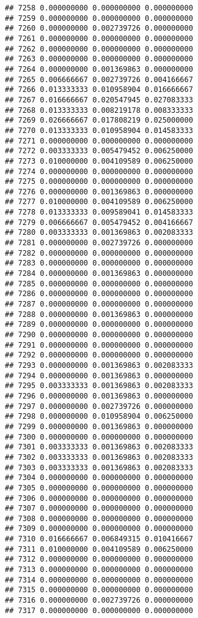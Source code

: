\documentclass[
]{article}
\begin{document}
\begin{verbatim}
## 7258 0.000000000 0.000000000 0.000000000
## 7259 0.000000000 0.000000000 0.000000000
## 7260 0.000000000 0.002739726 0.000000000
## 7261 0.000000000 0.000000000 0.000000000
## 7262 0.000000000 0.000000000 0.000000000
## 7263 0.000000000 0.000000000 0.000000000
## 7264 0.000000000 0.001369863 0.000000000
## 7265 0.006666667 0.002739726 0.004166667
## 7266 0.013333333 0.010958904 0.016666667
## 7267 0.016666667 0.020547945 0.027083333
## 7268 0.013333333 0.008219178 0.008333333
## 7269 0.026666667 0.017808219 0.025000000
## 7270 0.013333333 0.010958904 0.014583333
## 7271 0.000000000 0.000000000 0.000000000
## 7272 0.003333333 0.005479452 0.006250000
## 7273 0.010000000 0.004109589 0.006250000
## 7274 0.000000000 0.000000000 0.000000000
## 7275 0.000000000 0.000000000 0.000000000
## 7276 0.000000000 0.001369863 0.000000000
## 7277 0.010000000 0.004109589 0.006250000
## 7278 0.013333333 0.009589041 0.014583333
## 7279 0.006666667 0.005479452 0.004166667
## 7280 0.003333333 0.001369863 0.002083333
## 7281 0.000000000 0.002739726 0.000000000
## 7282 0.000000000 0.000000000 0.000000000
## 7283 0.000000000 0.000000000 0.000000000
## 7284 0.000000000 0.001369863 0.000000000
## 7285 0.000000000 0.000000000 0.000000000
## 7286 0.000000000 0.000000000 0.000000000
## 7287 0.000000000 0.000000000 0.000000000
## 7288 0.000000000 0.001369863 0.000000000
## 7289 0.000000000 0.000000000 0.000000000
## 7290 0.000000000 0.000000000 0.000000000
## 7291 0.000000000 0.000000000 0.000000000
## 7292 0.000000000 0.000000000 0.000000000
## 7293 0.000000000 0.001369863 0.002083333
## 7294 0.000000000 0.001369863 0.000000000
## 7295 0.003333333 0.001369863 0.002083333
## 7296 0.000000000 0.001369863 0.000000000
## 7297 0.000000000 0.002739726 0.000000000
## 7298 0.000000000 0.010958904 0.006250000
## 7299 0.000000000 0.001369863 0.000000000
## 7300 0.000000000 0.000000000 0.000000000
## 7301 0.003333333 0.001369863 0.002083333
## 7302 0.003333333 0.001369863 0.002083333
## 7303 0.003333333 0.001369863 0.002083333
## 7304 0.000000000 0.000000000 0.000000000
## 7305 0.000000000 0.000000000 0.000000000
## 7306 0.000000000 0.000000000 0.000000000
## 7307 0.000000000 0.000000000 0.000000000
## 7308 0.000000000 0.000000000 0.000000000
## 7309 0.000000000 0.000000000 0.000000000
## 7310 0.016666667 0.006849315 0.010416667
## 7311 0.010000000 0.004109589 0.006250000
## 7312 0.000000000 0.000000000 0.000000000
## 7313 0.000000000 0.000000000 0.000000000
## 7314 0.000000000 0.000000000 0.000000000
## 7315 0.000000000 0.000000000 0.000000000
## 7316 0.000000000 0.002739726 0.000000000
## 7317 0.000000000 0.000000000 0.000000000

\end{verbatim}
\end{document}
